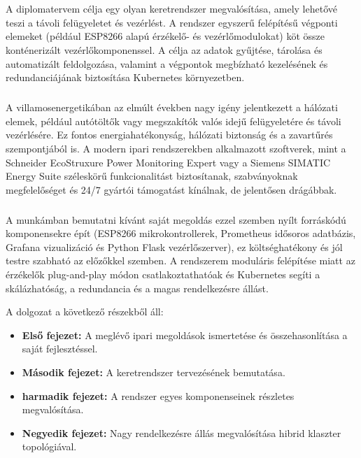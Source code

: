 \chapter{\bevezetes}

A diplomatervem célja egy olyan keretrendszer megvalósítása, 
amely lehetővé teszi a távoli felügyeletet és vezérlést. 
A rendszer egyszerű felépítésű végponti elemeket 
(például ESP8266 alapú érzékelő- és vezérlőmodulokat) köt össze 
konténerizált vezérlőkomponenssel. 
A célja az adatok gyűjtése, tárolása és automatizált feldolgozása, 
valamint a végpontok megbízható kezelésének és redundanciájának 
biztosítása Kubernetes környezetben.
\paragraph{}
A villamosenergetikában az elmúlt években nagy igény jelentkezett 
a hálózati elemek, például autótöltők vagy megszakítók valós 
idejű felügyeletére és távoli vezérlésére. Ez fontos energiahatékonyság,
hálózati biztonság és a zavartűrés szempontjából is. 
A modern ipari rendszerekben alkalmazott szoftverek, 
mint a Schneider EcoStruxure Power Monitoring Expert vagy a Siemens SIMATIC 
Energy Suite széleskörű funkcionalitást biztosítanak, szabványoknak megfelelőséget 
és 24/7 gyártói támogatást kínálnak, 
de jelentősen drágábbak.
\paragraph{}
A munkámban bemutatni kívánt saját megoldás ezzel szemben nyílt 
forráskódú komponensekre épít (ESP8266 mikrokontrollerek, Prometheus 
idősoros adatbázis, Grafana vizualizáció és Python Flask vezérlőszerver), 
ez költséghatékony és jól testre szabható az előzőkkel szemben. 
A rendszerem moduláris felépítése miatt az érzékelők plug-and-play módon
csatlakoztathatóak és Kubernetes 
segíti a skálázhatóság, a redundancia és a magas rendelkezésre állást.

A dolgozat a következő részekből áll:

\begin{itemize}
    \item \textbf{Első fejezet:} A meglévő ipari megoldások ismertetése és összehasonlítása a saját fejlesztéssel.
    \item \textbf{Második fejezet:} A keretrendszer tervezésének bemutatása.
    \item \textbf{harmadik fejezet:} A rendszer egyes komponenseinek részletes megvalósítása.
    \item \textbf{Negyedik fejezet:} Nagy rendelkezésre állás megvalósítása hibrid klaszter topológiával.
\end{itemize}